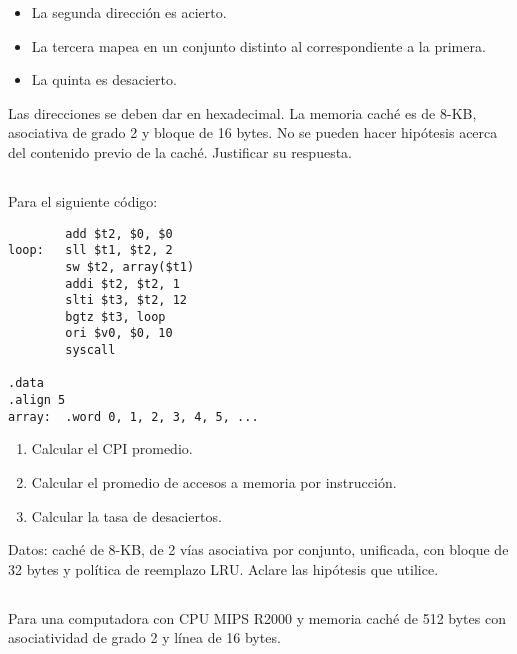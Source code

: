 \begin{itemize}
 \item La segunda dirección es acierto.
 \item La tercera mapea en un conjunto distinto al correspondiente a la primera.
 \item La quinta es desacierto.
\end{itemize}

Las direcciones se deben dar en hexadecimal. La memoria caché es de 8-KB, asociativa de grado 2 y bloque de 16 bytes. No se pueden hacer hipótesis acerca del contenido previo de la caché. Justificar su respuesta.

\subsection{}
Para el siguiente código:

\small
\begin{verbatim}
        add $t2, $0, $0
loop:   sll $t1, $t2, 2
        sw $t2, array($t1)
        addi $t2, $t2, 1
        slti $t3, $t2, 12
        bgtz $t3, loop
        ori $v0, $0, 10
        syscall

.data
.align 5
array:  .word 0, 1, 2, 3, 4, 5, ...
\end{verbatim}
\normalsize

\begin{enumerate}
 \item Calcular el CPI promedio.
 \item Calcular el promedio de accesos a memoria por instrucción.
 \item Calcular la tasa de desaciertos.
\end{enumerate}

Datos: caché de 8-KB, de 2 vías asociativa por conjunto, unificada, con bloque de 32 bytes y política de reemplazo LRU. Aclare las hipótesis que utilice.

\subsection{}
Para una computadora con CPU MIPS R2000 y memoria caché de 512 bytes con asociatividad de grado 2 y línea de 16 bytes.

